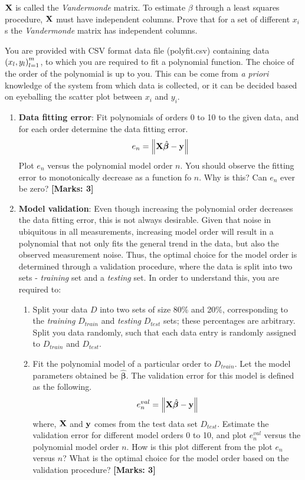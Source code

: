 \documentclass[12pt]{article}
\def\mf{\ensuremath\mathbf}
\def\lp{\ensuremath\left(}
\def\rp{\ensuremath\right)}
\def\lV{\ensuremath\left\lVert}
\def\rV{\ensuremath\right\rVert}
\begin{document}
\begin{enumerate}
    $\mf{X}$ is called the \textit{Vandermonde} matrix. To estimate $\beta$ through a least squares procedure, $\mf{X}$ must have independent columns. Prove that for a set of different $x_i$s the \textit{Vandermonde} matrix has independent columns.

    You are provided with CSV format data file (polyfit.csv) containing data $\lp x_l, y_l \rp_{l=1}^{m}$, to which you are required to fit a polynomial function. The choice of the order of the polynomial is up to you. This can be come from \textit{a priori} knowledge of the system from which data is collected, or it can be decided based on eyeballing the scatter plot between $x_i$ and $y_i$. 

    \begin{enumerate}
        \item \textbf{Data fitting error}: Fit polynomials of orders 0 to 10 to the given data, and for each order determine the data fitting error.
        \[ e_n = \lV\mf{X}\hat{\bm{\beta}} - \mf{y}\rV \]
        Plot $e_n$ versus the polynomial model order $n$. You should observe the fitting error to monotonically decrease as a function fo $n$. Why is this? Can $e_n$ ever be zero? \textbf{[Marks: 3]}

        \item \textbf{Model validation}: Even though increasing the polynomial order decreases the data fitting error, this is not always desirable. Given that noise in ubiquitous in all measurements, increasing model order will result in a polynomial that not only fits the general trend in the data, but also the observed measurement noise. Thus, the optimal choice for the model order is determined through a validation procedure, where the data is split into two sets - \textit{training} set and a \textit{testing} set. In order to understand this, you are required to:
        \begin{enumerate}
            \item Split your data $D$ into two sets of size 80\% and 20\%, corresponding to the \textit{training} $D_{train}$ and \textit{testing} $D_{test}$ sets; these percentages are arbitrary. Split you data randomly, such that each data entry is randomly assigned to $D_{train}$ and $D_{test}$. 

            \item Fit the polynomial model of a particular order to $D_{train}$. Let the model parameters obtained be $\hat{\bm{\beta}}$. The validation error for this model is defined as the following.
            \[ e_n^{val} = \lV\mf{X}\hat{\bm{\beta}} - \mf{y}\rV \]
            where, $\mf{X}$ and $\mf{y}$ comes from the test data set $D_{test}$. Estimate the validation error for different model orders 0 to 10, and plot $e_n^{val}$ versus the polynomial model order $n$. How is this plot different from the plot $e_n$ versus $n$? What is the optimal choice for the model order based on the validation procedure? \textbf{[Marks: 3]}
        \end{enumerate}


\end{enumerate}
\end{enumerate}
\end{document}
